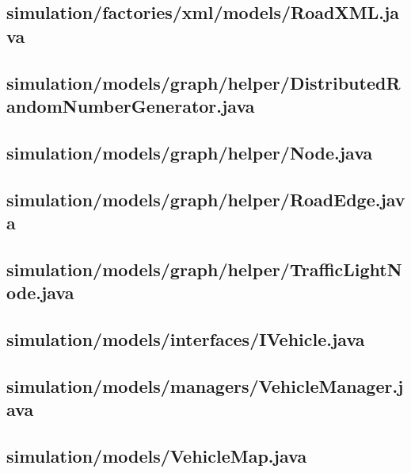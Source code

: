 \subsection{simulation/factories/xml/models/RoadXML.java}

\newpage
\subsection{simulation/models/graph/helper/DistributedRandomNumberGenerator.java}

\newpage
\subsection{simulation/models/graph/helper/Node.java}

\newpage
\subsection{simulation/models/graph/helper/RoadEdge.java}

\newpage
\subsection{simulation/models/graph/helper/TrafficLightNode.java}

\newpage
\subsection{simulation/models/interfaces/IVehicle.java}

\newpage
\subsection{simulation/models/managers/VehicleManager.java}

\newpage
\subsection{simulation/models/VehicleMap.java}

\newpage
